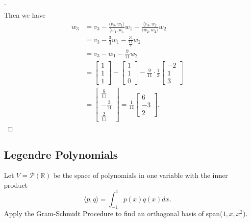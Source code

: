 \documentclass[11pt]{article}
\begin{document}
\begin{enumerate}
\begin{proof}[\unskip\nopunct]
\begin{align*}
            \end{align*}
            Then we have 
            \begin{align*}
                w_3 &= v_3 - \frac{\langle v_3, w_1 \rangle}{\langle w_1, w_1} w_1 - \frac{\langle v_3, w_2}{\langle w_2, w_2 \rangle} w_2 \\
                &= v_3 - \frac{3}{3} w_1 - \frac{3}{\frac{11}{3}} w_2 \\
                &= v_3 - w_1 - \frac{9}{11} w_2 \\
                &= \begin{bmatrix}
                    1 \\ 1 \\ 1
                \end{bmatrix} - \begin{bmatrix}
                    1 \\ 1 \\ 0
                \end{bmatrix} - \frac{9}{11} \cdot \frac{1}{3} \begin{bmatrix}
                    -2 \\ 1 \\ 3
                \end{bmatrix} \\
                &= \begin{bmatrix}
                    \frac{6}{11} \\ - \frac{3}{11} \\ \frac{2}{11}
                \end{bmatrix} = \frac{1}{11} \begin{bmatrix}
                    6 \\ -3 \\ 2
                \end{bmatrix}.
            \end{align*}
        \end{proof}
    \end{enumerate}

    \subsection{Legendre Polynomials}

    Let \(V = \mathcal{P}(\mathbb{R})\) be the space of polynomials in one variable with the inner product \[\langle p,q \rangle = \int_{-1}^{1} p(x) q(x) dx.\] Apply the Gram-Schmidt Procedure to find an orthogonal basis of span(\(1,x,x^2\)).
        
\end{document}
